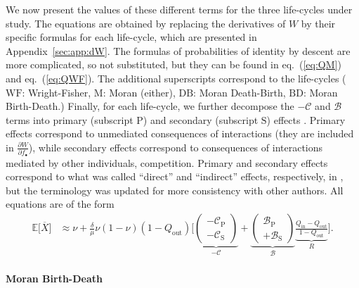 \documentclass[11pt, letterpaper]{article}
\renewcommand{\eqref}[1]{\textup{{\normalfont eq.~(\ref{#1}}\normalfont)}}
\newcommand{\derivn}[2]{\frac{\partial #1}{\partial #2}}
\newcommand{\Esp}[1]{\mathbb{E}\big[ #1\big]}%
\newcommand{\appname}[0]{Appendix}
\newcommand{\Moran}{\textrm{M}}
\newcommand{\BD}{\textrm{BD}}
\newcommand{\DB}{\textrm{DB}}
\newcommand{\WF}{\textrm{WF}}
\newcommand{\mutbias}{\nu}
\newcommand{\inn}{\textrm{in}}
\newcommand{\out}{\textrm{out}}
\newcommand{\focal}{\bullet}
\newcommand{\prim}{\textrm{P}}
\newcommand{\secd}{\textrm{S}}
\newcommand{\selstr}{\delta}
\begin{document}
We now present the values of these different terms for the three life-cycles under study. The equations are obtained by replacing the derivatives of $W$ by their specific formulas for each life-cycle, which are presented in \appname~\ref{sec:app:dW}. The formulas of  probabilities of identity by descent are more complicated, so not substituted, but they can be found in \eqref{eq:QM} and \eqref{eq:QWF}. The additional superscripts correspond to the life-cycles ($\WF$: Wright-Fisher, $\Moran$: Moran (either), $\DB$: Moran Death-Birth, $\BD$: Moran Birth-Death.) Finally, for each life-cycle, we further decompose the $-\mathcal{C}$ and $\mathcal{B}$ terms into primary (subscript $\prim$) and secondary (subscript $\secd$) effects \citep{WestGardner2010}. Primary effects correspond to unmediated consequences of interactions (they are included in $\derivn{W}{f_{\focal}}$), while secondary effects correspond to consequences of interactions mediated by other individuals, competition. Primary and secondary effects correspond to what was called ``direct'' and ``indirect'' effects, respectively, in \citet{DebarreHD2014, Debarre2017}, but the terminology was updated for more consistency with other authors. All equations are of the form
%
\begin{equation}\label{eq:EXgeneric}
\begin{split}
\Esp{\overline{X}} & \approx \mutbias + 
\frac{\selstr}{\mu}  \mutbias (1-\mutbias) (1 - Q_{\out}) 
 \Bigg[ \underbrace{ \begin{pmatrix}
 -\mathcal{C}_{\prim} \\
 -\mathcal{C}_{\secd} 
 \end{pmatrix}
}_{-\mathcal{C}} + \underbrace{ \begin{pmatrix}
\mathcal{B}_{\prim} \\
+ \mathcal{B}_{\secd} 
\end{pmatrix}
}_{\mathcal{B}} \underbrace{\frac{Q_{\inn} - Q_{\out}}{1 - Q_{\out}}}_{R} \Bigg].
\end{split}
\end{equation}

\paragraph{Moran Birth-Death}
\end{document}
